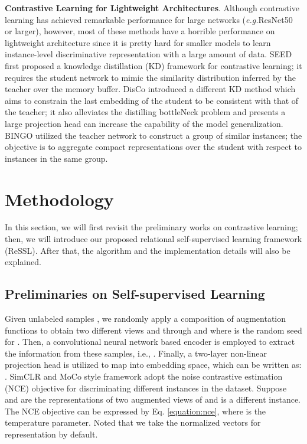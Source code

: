 \documentclass{article}
\newcommand{\<}{\left\langle}
\renewcommand{\>}{\right\rangle}
\newcommand{\eg}{{\emph{e.g.}}}
\begin{document}
\textbf{Contrastive Learning for Lightweight Architectures}. Although contrastive learning has achieved remarkable performance for large networks (\eg ResNet50 or larger), however, most of these methods have a horrible performance on lightweight architecture since it is pretty hard for smaller models to learn instance-level discriminative representation with a large amount of data. SEED \cite{seed} first proposed a knowledge distillation (KD) framework for contrastive learning; it requires the student network to mimic the similarity distribution inferred by the teacher over the memory buffer. DisCo \cite{disco} introduced a different KD method which aims to constrain the last embedding of the student to be consistent with that of the teacher; it also alleviates the distilling bottleNeck problem and presents a large projection head can increase the capability of the model generalization. BINGO \cite{bingo} utilized the teacher network to construct a group of similar instances; the objective is to aggregate compact representations over the student with respect
to instances in the same group.
 
\label{section:method}
\section{Methodology}

In this section, we will first revisit the preliminary works on contrastive learning; then, we will introduce our proposed relational self-supervised learning framework (ReSSL). After that, the algorithm and the implementation details will also be explained.

\subsection{Preliminaries on Self-supervised Learning}
Given  unlabeled samples , we randomly apply a composition of augmentation functions  to obtain two different views  and  through  and  where  is the random seed for . Then, a convolutional neural network based encoder  is employed to extract the information from these samples, i.e.,   . Finally, a two-layer non-linear projection head  is utilized to map  into embedding space, which can be written as: . SimCLR \cite{simclr} and MoCo \cite{moco} style framework adopt the noise contrastive estimation (NCE) objective for discriminating different instances in the dataset. Suppose  and  are the representations of two augmented views of  and  is a different instance. The NCE objective can be expressed by Eq. \eqref{equation:nce}, where  is the temperature parameter. Noted that we take the  normalized vectors for representation  by default. 
\end{document}
